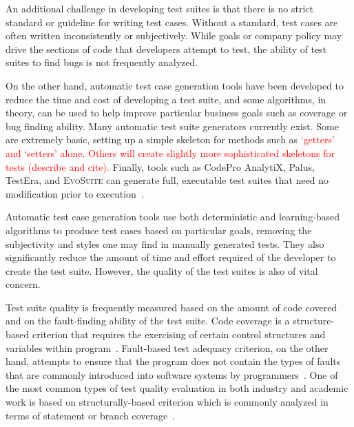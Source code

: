 An additional challenge in developing test suites is that there is no strict standard or guideline for writing test cases.  Without a standard, test cases are often written inconsistently or subjectively.  While goals or company policy may drive the sections of code that developers attempt to test, the ability of test suites to find bugs is not frequently analyzed.

On the other hand, automatic test case generation tools have been developed to reduce the time and cost of developing a
test suite, and some algorithms, in theory, can be used to help improve particular business goals such as coverage or
bug finding ability.  Many automatic test suite generators currently exist.  Some are extremely basic, setting up a
simple skeleton for methods such as \textcolor{red}{`getters' and `setters' alone}\cite{}.  \textcolor{red}{Others will
  create slightly more sophisticated skeletons for tests (describe and cite).}  Finally, tools such as CodePro AnalytiX,
Palus, TestEra, and \textsc{EvoSuite} can generate full, executable test suites that need no modification prior to execution~\cite{fraser:2011:eat:2025113.2025179, Zhang:2011:PHA:1985793.1986036, Marinov:2001:TNF:872023.872551, codepro}.  

Automatic test case generation tools use both deterministic and learning-based algorithms to produce test cases based on particular goals, removing the subjectivity and styles one may find in manually generated tests.  They also significantly reduce the amount of time and effort required of the developer to create the test suite.  However, the quality of the test suites is also of vital concern.  

Test suite quality is frequently measured based on the amount of code covered and on the fault-finding ability of the test suite.  Code coverage is a structure-based criterion that requires the exercising of certain control structures and variables within program~\cite{kapfhammer-testing-handbook}. Fault-based test adequacy criterion, on the other hand, attempts to ensure that the program does not contain the types of faults that are commonly introduced into software systems by programmers~\cite{demillo1978hints, zhu1997software}.  One of the most common types of test quality evaluation in both industry and academic work is based on structurally-based criterion which is commonly analyzed in terms of statement or branch coverage~\cite{weyuker1988evaluation}.

